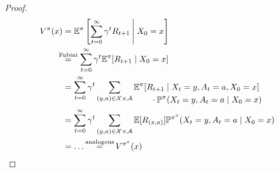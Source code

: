 \begin{proof}
	\begin{align*}
		V^\pi(x)
		&=\E^\pi\left[\sum_{t=0}^\infty \gamma^t R_{t+1} \:\middle|\; X_0=x \right]\\
		&\lxeq{\text{Fubini}} \sum_{t=0}^\infty \gamma^t \E^\pi[R_{t+1}\mid X_0=x]\\
		&=\sum_{t=0}^\infty \gamma^t \sum_{(y,a)\in\cX\times\cA}
		\begin{aligned}[t]
		&\E^\pi[R_{t+1}\mid X_t=y, A_t=a, X_0=x]\\
		&\qquad\cdot\Pr^\pi(X_t=y,A_t=a\mid X_0=x)
		\end{aligned}\\
		&=\sum_{t=0}^\infty \gamma^t \sum_{(y,a)\in\cX\times\cA}\E[R_{(x,a)}]
		\Pr^{\pi^x}(X_t=y,A_t=a\mid X_0=x)\\
		&=\dots \xeq{\text{analogous}} V^{\pi^x}(x)\qedhere
	\end{align*}
\end{proof}

